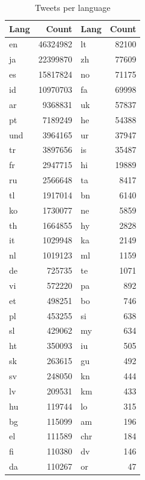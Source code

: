 \documentclass[a4paper,11pt]{article}
\begin{document}
\begin{table}
\centering
\begin{tabular}{|l|r||l|r|}
\hline
Lang & Count & Lang & Count \\
\hline
en & 46324982 &             lt & 82100 \\
ja & 22399870 &             zh & 77609 \\
es & 15817824 &             no & 71175 \\
id & 10970703 &             fa & 69998 \\
ar & 9368831 &                      uk & 57837 \\
pt & 7189249 &                      he & 54388 \\
und & 3964165 &             ur & 37947 \\
tr & 3897656 &                      is & 35487 \\
fr & 2947715 &                      hi & 19889 \\
ru & 2566648 &                      ta & 8417 \\
tl & 1917014 &                      bn & 6140 \\
ko & 1730077 &                      ne & 5859 \\
th & 1664855 &                      hy & 2828 \\
it & 1029948 &                      ka & 2149 \\
nl & 1019123 &                      ml & 1159 \\
de & 725735 &                       te & 1071 \\
vi & 572220 &                       pa & 892 \\
et & 498251 &                       bo & 746 \\
pl & 453255 &                       si & 638 \\
sl & 429062 &                       my & 634 \\
ht & 350093 &                       iu & 505 \\
sk & 263615 &                       gu & 492 \\
sv & 248050 &                       kn & 444 \\
lv & 209531 &                       km & 433 \\
hu & 119744 &                       lo & 315 \\
bg & 115099 &                       am & 196 \\
el & 111589 &                       chr & 184 \\
fi & 110380 &                       dv & 146 \\
da & 110267 &                       or & 47 \\
\hline
\end{tabular}
\label{twperlang}
\caption{Tweets per language}
\end{table}
\end{document}
